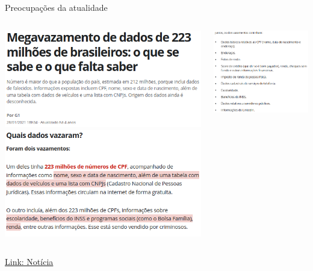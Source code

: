 \begin{frame}{Preocupações da atualidade}
\centering
\begin{columns}
    \begin{column}{0.48\linewidth}
        \includegraphics[width=\linewidth]{Figuras/megavazamento1.png}
        \includegraphics[width=\linewidth]{Figuras/megavazamento2.png}
    \end{column}
    \begin{column}{0.48\linewidth}
        \includegraphics[width=\linewidth]{Figuras/megavazamento3.png}
    \end{column}
\end{columns}
\href{https://g1.globo.com/economia/tecnologia/noticia/2021/01/28/vazamento-de-dados-de-223-milhoes-de-brasileiros-o-que-se-sabe-e-o-que-falta-saber.ghtml}{Link: Notícia}

\end{frame}
